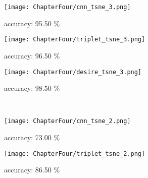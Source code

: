 \begin{figure}[ht!]
    \begin{minipage}[t!]{0.015\textwidth}
    \end{minipage}
    \begin{minipage}[t!]{0.985\textwidth}
        \captionsetup[subfigure]{labelformat=empty}
        \centering
        \begin{subfigure}{0.325\textwidth}
            \centering
            \texttt{[image: ChapterFour/cnn\_tsne\_3.png]}
            \caption{accuracy: 95.50 \%}
        \end{subfigure}
        \hfill
        \begin{subfigure}{0.325\textwidth}
            \centering
            \texttt{[image: ChapterFour/triplet\_tsne\_3.png]}
            \caption{accuracy: 96.50 \%}
        \end{subfigure}
        \hfill
        \begin{subfigure}{0.325\textwidth}
            \centering
            \texttt{[image: ChapterFour/desire\_tsne\_3.png]}
            \caption{accuracy: 98.50 \%}
        \end{subfigure}
    \end{minipage}
    \\ \vspace{0.5 cm}
    \begin{minipage}[t!]{0.015\textwidth}
    \end{minipage}
    \begin{minipage}[t!]{0.985\textwidth}
        \captionsetup[subfigure]{labelformat=empty}
        \begin{subfigure}{0.325\textwidth}
            \centering
            \texttt{[image: ChapterFour/cnn\_tsne\_2.png]}
            \caption{accuracy: 73.00 \%}
        \end{subfigure}
        \hfill
        \begin{subfigure}{0.325\textwidth}
            \centering
            \texttt{[image: ChapterFour/triplet\_tsne\_2.png]}
            \caption{accuracy: 86.50 \%}
        \end{subfigure}
        \hfill
        \begin{subfigure}{0.325\textwidth}

\end{subfigure}
\end{minipage}
\end{figure}
